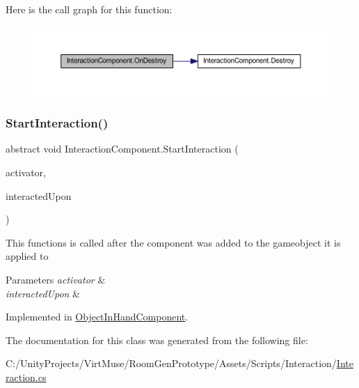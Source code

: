 Here is the call graph for this function\+:
\nopagebreak
\begin{figure}[H]
\begin{center}
\leavevmode
\includegraphics[width=350pt]{class_interaction_component_a3add77b0cb9df6b962ea2c66d317fa46_cgraph}
\end{center}
\end{figure}
\mbox{\label{class_interaction_component_a80d4c2288af453dd9611bbea092843e5}} 
\subsubsection{\texorpdfstring{Start\+Interaction()}{StartInteraction()}}
{\footnotesize\ttfamily abstract void Interaction\+Component.\+Start\+Interaction (\begin{DoxyParamCaption}\item[{Game\+Object}]{activator,  }\item[{Game\+Object}]{interacted\+Upon }\end{DoxyParamCaption})\hspace{0.3cm}{\ttfamily [pure virtual]}}



This functions is called after the component was added to the gameobject it is applied to 


\begin{DoxyParams}{Parameters}
{\em activator} & \\
\hline
{\em interacted\+Upon} & \\
\hline
\end{DoxyParams}


Implemented in \mbox{\hyperlink{class_object_in_hand_component_aed115a3a0f70c23370cab4428454025c}{Object\+In\+Hand\+Component}}.



The documentation for this class was generated from the following file\+:\begin{DoxyCompactItemize}
\item 
C\+:/\+Unity\+Projects/\+Virt\+Muse/\+Room\+Gen\+Prototype/\+Assets/\+Scripts/\+Interaction/\mbox{\hyperlink{_interaction_8cs}{Interaction.\+cs}}\end{DoxyCompactItemize}
